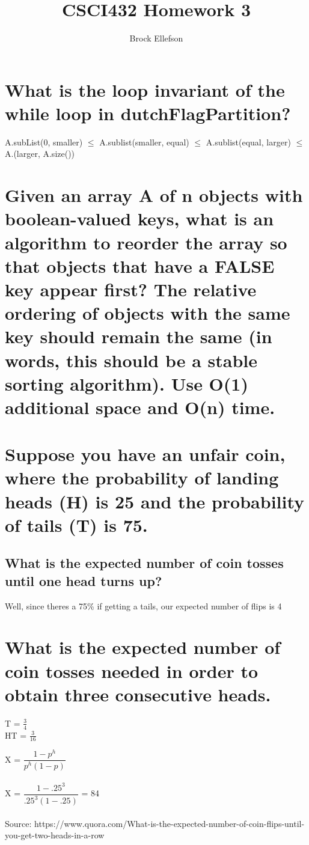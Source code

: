 \documentclass[10pt,letterpaper]{article}
\author{Brock Ellefson}
\title{CSCI432 Homework 3}
\begin{document}
\maketitle
\section{What is the loop invariant of the while loop in dutchFlagPartition?}
A.subList(0, smaller) $\leq$ A.sublist(smaller, equal) $\leq$ A.sublist(equal, larger) $\leq$ A.(larger, A.size())

\section{Given an array A of n objects
with boolean-valued keys, what is an algorithm to reorder
the array so that objects that have a FALSE key
appear first? The relative ordering of objects with
the same key should remain the same (in words, this
should be a stable sorting algorithm). Use O(1) additional
space and O(n) time.}

\section{Suppose you have an unfair
coin, where the probability of landing heads (H) is
25 and the probability of tails (T) is 75.}

\subsection{What is the expected number of coin tosses until one head
turns up?}

Well, since theres a 75\% if getting a tails, our expected number of flips is 4 

\section{What is the expected number of coin tosses
needed in order to obtain three consecutive heads.}
T = $\frac{3}{4}$ \\
HT = $\frac{3}{16}$ 




X = $\dfrac{1-p^{h}}{p^{h}(1-p)}$\\\\
X = $\dfrac{1-.25^{3}}{.25^{3}(1-.25)}$ = 84\\\\
Source: https://www.quora.com/What-is-the-expected-number-of-coin-flips-until-you-get-two-heads-in-a-row
\end{document}
